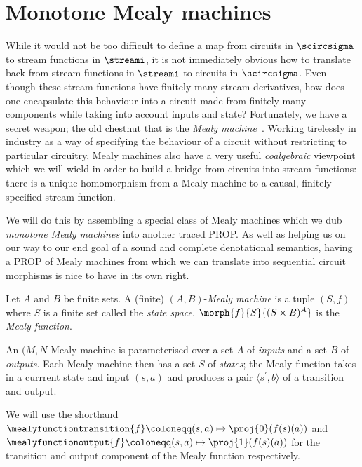 \section{Monotone Mealy machines}

While it would not be too difficult to define a map from circuits in
\(\scircsigma\) to stream functions in \(\streami\), it is not immediately
obvious how to translate back from stream functions in \(\streami\) to circuits
in \(\scircsigma\).
Even though these stream functions have finitely many stream derivatives, how
does one encapsulate this behaviour into a circuit made from finitely many
components while taking into account inputs and state?
Fortunately, we have a secret weapon; the old chestnut that is the
\emph{Mealy machine}~\cite{mealy1955method}.
Working tirelessly in industry as a way of specifying the behaviour of a
circuit without restricting to particular circuitry, Mealy machines also have
a very useful \emph{coalgebraic} viewpoint which we will wield in order to
build a bridge from circuits into stream functions: there is a unique
homomorphism from a Mealy machine to a causal, finitely specified stream
function.

We will do this by assembling a special class of Mealy machines which we dub
\emph{monotone Mealy machines} into another traced PROP.
As well as helping us on our way to our end goal of a sound and complete
denotational semantics, having a PROP of Mealy machines from which we can
translate into sequential circuit morphisms is nice to have in its own right.

\begin{definition}\label{def:mealy}
    Let \(A\) and \(B\) be finite sets.
    A (finite) \((A,B)\)-\emph{Mealy machine} is a tuple \((S, f)\) where
    \(S\) is a finite set called the \emph{state space},
    \(\morph{f}{S}{(S \times B)^A}\) is the \emph{Mealy function}.
\end{definition}

An \((M,N\)-Mealy machine is parameterised over a set \(A\) of \emph{inputs} and
a set \(B\) of \emph{outputs}.
Each Mealy machine then has a set \(S\) of \emph{states}; the Mealy function
takes in a currrent state and input \((s, a)\) and produces a pair
\(\langle{s^\prime, b}\rangle\) of a transition and output.

\begin{notation}
    We will use the shorthand \(
    \mealyfunctiontransition{f} \coloneqq (s, a) \mapsto \proj{0}(f(s)(a))
    \) and \(
    \mealyfunctionoutput{f} \coloneqq (s, a) \mapsto \proj{1}(f(s)(a))
    \) for the transition and output component of the Mealy function respectively.
\end{notation}

